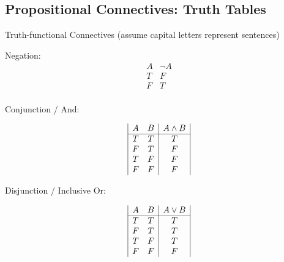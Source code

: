 \subsection{Propositional Connectives: Truth Tables}

Truth-functional Connectives  (assume capital letters represent sentences)

Negation:
\[
\begin{array}{|c|c|}
  A & \lnot A\\ %
\hline %
T & F\\
F & T\\
\end{array}
\]

Conjunction / And:

\[
\begin{array}{|c c|c|}
A & B & A \land B\\ %
\hline %
T & T & T\\
F & T & F\\
T & F & F\\
F & F & F\\
\end{array}
\]

Disjunction / Inclusive Or:

\[
\begin{array}{|c c|c|}
A & B & A \lor B\\ %
\hline %
T & T & T\\
F & T & T\\
T & F & T\\
F & F & F\\
\end{array}
\]

